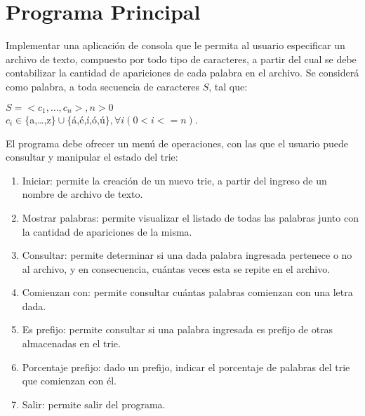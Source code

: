 \documentclass[12pt,a4paper]{article}
\begin{document}
\section{Programa Principal}
Implementar una aplicación de consola que le permita al usuario especificar un archivo de texto, compuesto por todo tipo de caracteres, a partir del cual se debe contabilizar la cantidad de apariciones de cada palabra en el archivo. Se considerá como palabra, a toda secuencia de caracteres $S$, tal que:
\begin{center}
$S=<c_1,\dots,c_n>, n>0$\\
$c_i \in \{$a,\dots,z$\} \cup \{$á,é,í,ó,ú$\}, \forall{i} (0<i<=n)$.
\end{center}

El programa debe ofrecer un menú de operaciones, con las que el usuario puede consultar y manipular el estado del trie:
\begin{enumerate}	
	\item Iniciar: permite la creación de un nuevo trie, a partir del ingreso de un nombre de archivo de texto.
	
	\item Mostrar palabras: permite visualizar el listado de todas las palabras junto con la cantidad de apariciones de la misma.
	
	\item Consultar: permite determinar si una dada palabra ingresada pertenece o no al archivo, y en consecuencia, cuántas veces esta se repite en el archivo.
	
	\item Comienzan con: permite consultar cuántas palabras comienzan con una letra dada.
	
	\item Es prefijo: permite consultar si una palabra ingresada es prefijo de otras almacenadas en el trie.

	\item Porcentaje prefijo: dado un prefijo, indicar el porcentaje de palabras del trie que comienzan con él. 
	
	\item Salir: permite salir del programa.
\end{enumerate}
	
\end{document}
